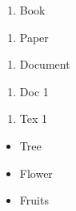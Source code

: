 \documentclass{book}
\begin{document}
\begin{enumerate}[1]
\item Book 

\end{enumerate}
\begin{enumerate}[1, start=2]
\item Paper 

\end{enumerate}
\begin{enumerate}[1, start=3]
\item Document 

\end{enumerate}
\begin{enumerate}[a]
\item Doc 1 

\end{enumerate}
\begin{enumerate}[a, start=2]
\item Tex 1 

\end{enumerate}
\begin{itemize}
\item Tree 

\end{itemize}
\begin{itemize}
\item Flower 

\end{itemize}
\begin{itemize}
\item Fruits 

\end{itemize}
\end{document}
